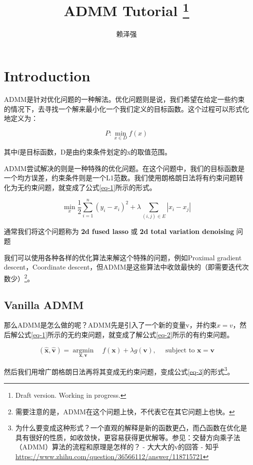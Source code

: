 \documentclass[10pt]{report}
\title{ADMM Tutorial
     \thanks{Draft version. Working in progress.}}
\author{赖泽强}
\begin{document}
\maketitle
\tableofcontents

\chapter{Introduction}

ADMM是针对优化问题的一种解法。优化问题则是说，我们希望在给定一些约束的情况下，去寻找一个解来最小化一个我们定义的目标函数。这个过程可以形式化地定义为：

$$
P: \min _{x \in D} f(x)
$$

其中f是目标函数，D是由约束条件划定的x的取值范围。

ADMM尝试解决的则是一种特殊的优化问题。在这个问题中，我们的目标函数是一个均方误差，约束条件则是一个L1范数。我们使用朗格朗日法将有约束问题转化为无约束问题，就变成了公式\ref{eq-1}所示的形式。

\begin{equation}
\min _{x} \frac{1}{2} \sum_{i=1}^{n}\left(y_{i}-x_{i}\right)^{2}+\lambda \sum_{(i, j) \in E}\left|x_{i}-x_{j}\right|
\label{eq-1}
\end{equation}


通常我们将这个问题称为 \textbf{2d fused lasso} 或 \textbf{2d total variation denoising} 问题


我们可以使用各种各样的优化算法来解这个特殊的问题，例如Proximal gradient descent，Coordinate descent，但ADMM是这些算法中收敛最快的（即需要迭代次数少）\footnote{需要注意的是，ADMM在这个问题上快，不代表它在其它问题上也快。}。

\section{Vanilla ADMM}

那么ADMM是怎么做的呢？ADMM先是引入了一个新的变量v，并约束$x=v$，然后解公式\ref{eq-1}所示的无约束问题，就变成了解公式\ref{eq-2}所示的有约束问题。

\begin{equation}
(\widehat{\boldsymbol{x}}, \widehat{\boldsymbol{v}})=\underset{\boldsymbol{x}, \boldsymbol{v}}{\operatorname{argmin}} \quad f(\boldsymbol{x})+\lambda g(\boldsymbol{v}), \quad \text { subject to } \boldsymbol{x}=\boldsymbol{v}
\label{eq-2}
\end{equation}

然后我们用增广朗格朗日法再将其变成无约束问题，变成公式\ref{eq-3}的形式\footnote{为什么要变成这种形式？一个直观的解释是新的函数更凸，而凸函数在优化是具有很好的性质，如收敛快，更容易获得更优解等。参见：交替方向乘子法（ADMM）算法的流程和原理是怎样的？ - 大大大的v的回答 - 知乎 \url{https://www.zhihu.com/question/36566112/answer/118715721}}。
\end{document}

